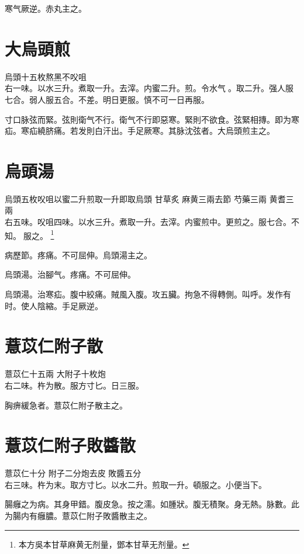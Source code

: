 寒气厥逆。赤丸主之。

\section{大烏頭煎}

烏頭{\scriptsize 十五枚熬黑不㕮咀}\\
右一味。以水三升。煮取一升。去滓。内蜜二升。煎。令水气{\sungii 𥁞}。取二升。强人服七合。弱人服五合。不差。明日更服。慎不可一日再服。

寸口脉弦而緊。弦則衛气不行。衛气不行即惡寒。緊則不欲食。弦緊相摶。即为寒疝。寒疝繞脐痛。若发則白汗出。手足厥寒。其脉沈弦者。大烏頭煎主之。

\section{烏頭湯}

烏頭{\scriptsize 五枚㕮咀以蜜二升煎取一升即取烏頭} 甘草{\scriptsize 炙} 麻黄{\scriptsize 三兩去節} 芍藥{\scriptsize 三兩} 黄耆{\scriptsize 三兩}\\
右五味。㕮咀四味。以水三升。煮取一升。去滓。内蜜煎中。更煎之。服七合。不知。{\sungii 𥁞}服之。
\footnote{本方吳本甘草麻黄无剂量，鄧本甘草无剂量。}

病歷節。疼痛。不可屈伸。烏頭湯主之。

烏頭湯。治腳气。疼痛。不可屈伸。

烏頭湯。治寒疝。腹中絞痛。賊風入腹。攻五臟。拘急不得轉側。叫呼。发作有时。使人陰縮。手足厥逆。

\section{薏苡仁附子散}

薏苡仁{\scriptsize 十五兩} 大附子{\scriptsize 十枚炮}\\
右二味。杵为散。服方寸匕。日三服。

胸痹緩急者。薏苡仁附子散主之。

\section{薏苡仁附子敗醬散}

薏苡仁{\scriptsize 十分} 附子{\scriptsize 二分炮去皮} 敗醬{\scriptsize 五分}\\
右三味。杵为末。取方寸匕。以水二升。煎取一升。頓服之。小便当下。

腸癰之为病。其身甲錯。腹皮急。按之濡。如腫狀。腹无積聚。身无熱。脉數。此为腸内有{\khaai 癰}膿。薏苡{\khaai 仁}附子敗醬散主之。

